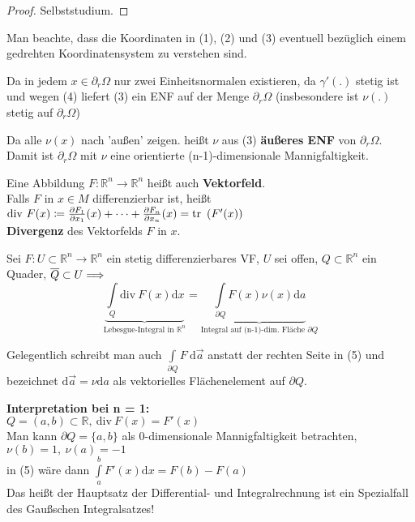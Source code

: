 \begin{proof}
    Selbststudium.
\end{proof}

Man beachte, dass die Koordinaten in (1), (2) und (3) eventuell bezüglich einem
gedrehten Koordinatensystem zu verstehen sind.

Da in jedem $x \in \partial_r \Omega $ nur zwei Einheitsnormalen existieren, da
$\gamma'(.) $ stetig ist und wegen (4) liefert (3) ein ENF auf der Menge
$\partial_r \Omega $ (insbesondere ist $\nu(.) $ stetig auf $\partial_r \Omega $)

Da alle $\nu(x) $ nach 'außen' zeigen. heißt $\nu$ aus (3) \textbf{äußeres ENF} von
$\partial_r \Omega $.\\
Damit ist $\partial_r \Omega $ mit $\nu$ eine orientierte (n-1)-dimensionale
Mannigfaltigkeit.

\begin{definition}
    Eine Abbildung $F: \mathbb{R}^n \rightarrow \mathbb{R}^n $ heißt auch
    \textbf{Vektorfeld}.\\
    Falls $F$ in $x \in M $ differenzierbar ist, heißt \\
    $\mathrm{div\ }F(x) \coloneqq \frac{\partial{F_1}}{\partial{x_1}}(x) + \cdots + \frac{\partial{F_n}}{\partial{x_n}}(x) =
    \mathrm{tr\ }\left(F'(x)\right) $\\
    \textbf{Divergenz} des Vektorfelds $F$ in $x$.
\end{definition}

\begin{satz}
Sei $F: U \subset \mathbb{R}^n \rightarrow \mathbb{R}^n $ ein stetig differenzierbares VF,
$U$ sei offen, $Q \subset \mathbb{R}^n $ ein Quader, $\overline{Q} \subset U \\
\Longrightarrow $
\begin{equation}
    \underbrace
        {\int\limits_Q \mathrm{div\ } F(x) \mathrm{d}x
    }_{
        \text{Lebesgue-Integral in }\mathbb{R}^n}
    =
    \underbrace{
        \int\limits_{\partial Q} F(x) \nu(x) \mathrm{d}a
    }_{
        \text{Integral auf (n-1)-dim. Fläche } \partial Q
    }    
\end{equation}

\end{satz}

Gelegentlich schreibt man auch $\int\limits_{\partial Q} F \ \mathrm{d}\vec{a} $ anstatt
der rechten Seite in (5) und bezeichnet
$\mathrm{d}\vec{a} = \nu \mathrm{d}a $ als vektorielles Flächenelement auf
$\partial Q $.

\textbf{Interpretation bei n = 1:}\\
$Q = (a,b) \subset \mathbb{R}, \ \mathrm{div\ } F(x) = F'(x) $ \\
Man kann $\partial Q = \lbrace a, b \rbrace $ 
als 0-dimensionale Mannigfaltigkeit betrachten,\\
$\nu(b) = 1, \ \nu(a) = -1 $\\
in (5) wäre dann
$\int\limits_a^b F'(x) \mathrm{d}x = F(b) - F(a) $\\
Das heißt der Hauptsatz der Differential- und Integralrechnung ist
ein Spezialfall des Gaußschen Integralsatzes!